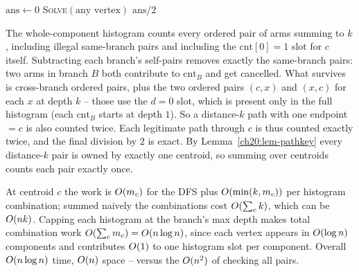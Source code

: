 \begin{algorithm}[H]
\caption{Count pairs at distance exactly $k$ via centroid decomposition}
\label{ch20:alg-count}
\DontPrintSemicolon
{}
$\mathrm{ans}\gets 0$\;
\textsc{Solve}$(\text{any vertex})$\;
\Return $\mathrm{ans}/2$\;
\end{algorithm}

\begin{whybox}
The whole-component histogram counts every ordered pair of arms summing to $k$,
including illegal same-branch pairs and including the $\mathrm{cnt}[0]=1$ slot for
$c$ itself. Subtracting each branch's self-pairs removes exactly the same-branch
pairs: two arms in branch $B$ both contribute to $\mathrm{cnt}_B$ and get
cancelled. What survives is cross-branch ordered pairs, plus the two ordered pairs
$(c,x)$ and $(x,c)$ for each $x$ at depth $k$ -- those use the $d=0$ slot, which is
present only in the full histogram (each $\mathrm{cnt}_B$ starts at depth $1$). So a
distance-$k$ path with one endpoint $=c$ is also counted twice. Each legitimate
path through $c$ is thus counted exactly twice, and the final division by $2$ is
exact. By Lemma~\ref{ch20:lem-pathkey} every distance-$k$ pair is owned by exactly
one centroid, so summing over centroids counts each pair exactly once.
\end{whybox}

\begin{complexitybox}
At centroid $c$ the work is $O(m_c)$ for the DFS plus $O(\min(k,m_c))$ per
histogram combination; summed naively the combinations cost $O(\sum_c k)$, which
can be $O(nk)$. Capping each histogram at the branch's max depth makes total
combination work $O(\sum_c m_c)=O(n\log n)$, since each vertex appears in
$O(\log n)$ components and contributes $O(1)$ to one histogram slot per
component. Overall $O(n\log n)$ time, $O(n)$ space -- versus the $O(n^2)$ of
checking all pairs.
\end{complexitybox}

